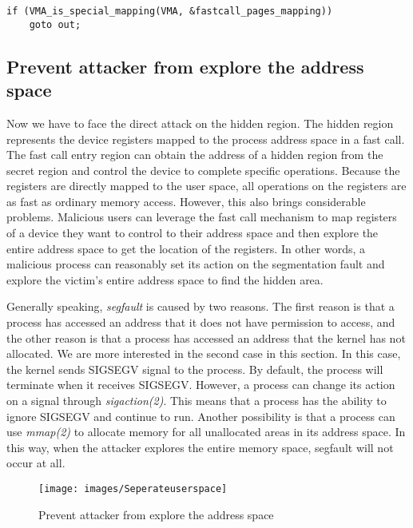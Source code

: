 \begin{lstlisting}[style=CStyle]
  if (VMA_is_special_mapping(VMA, &fastcall_pages_mapping))
    goto out;
\end{lstlisting}
 

\subsection{Prevent attacker from explore the address space}
Now we have to face the direct attack on the hidden region. 
The hidden region represents the device registers mapped to the
 process address space in a fast call. The fast call entry region 
 can obtain the address of a  hidden region from the secret region and
  control the device to complete specific operations. Because the 
  registers are directly mapped to the user space, all operations 
  on the registers are as fast as ordinary memory access. However, 
  this also brings considerable problems. Malicious users can 
  leverage the fast call mechanism to map registers of a device 
  they want to control to their address space and then explore the 
  entire address space to get the location of the registers. 
  In other words, a malicious process can reasonably set its 
  action on the segmentation fault and explore the victim's 
  entire address space to find the hidden area.

Generally speaking, \emph{segfault} is caused by two reasons. 
The first reason is that a process has accessed an address 
that it does not have permission to access, and the other 
reason is that a process has accessed an address that the 
kernel has not allocated. We are more interested in the 
second case in this section. In this case, the kernel sends 
SIGSEGV signal to the process. By default,  the process will 
terminate when it receives SIGSEGV.  However, a process can 
change its action on a signal through \emph{sigaction(2)}. This 
means that a process has the ability to ignore SIGSEGV 
and continue to run. Another possibility is that a process 
can use \emph{mmap(2)} to allocate memory for all unallocated 
areas in its address space. In this way, when the attacker 
explores the entire memory space, segfault will not occur at all.

\begin{figure}[H]
  \centering
  \texttt{[image: images/Seperateuserspace]}
  \caption[Short description]{Prevent attacker from explore the address space}
  \label{fig:Seperateuserspace}
\end{figure}


